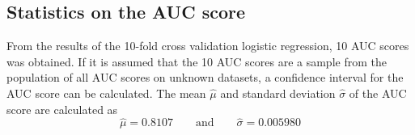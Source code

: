 \subsection{Statistics on the AUC score}
From the results of the 10-fold cross validation logistic regression, 10 AUC scores was obtained. If it is assumed that the 10 AUC scores are a sample from the population of all AUC scores on unknown datasets, a confidence interval for the AUC score can be calculated. The mean $\widehat{\mu}$ and standard deviation $\widehat{\sigma}$ of the AUC score are calculated as
\[
\widehat{\mu} = 0.8107 \quad\quad\text{and}\quad\quad \widehat{\sigma} = 0.005980
\]
